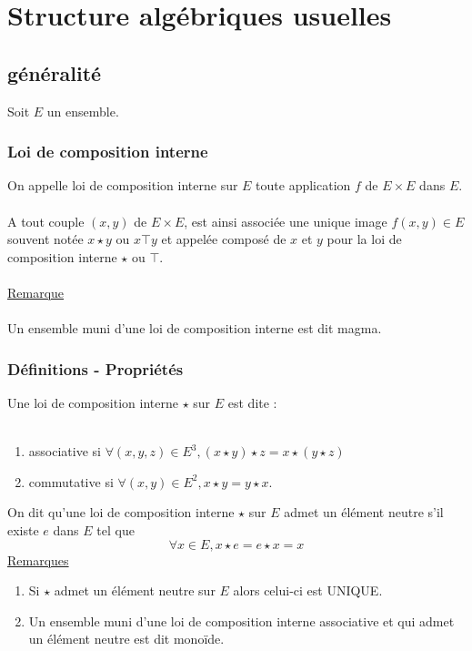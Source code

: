 \chapter{Structure algébriques usuelles}

\minitoc

\section{généralité}
Soit \(E\) un ensemble.
\subsection{Loi de composition interne}
\begin{defprop}
    On appelle loi de composition interne sur \(E\) toute application \(f\) de \(E \times E\) dans \(E\).\\~\\
    A tout couple \((x, y)\) de \(E \times E\), est ainsi associée une unique image \(f (x, y) \in E\) souvent notée \(x \star y\) ou \(x\top y\) et appelée composé de \(x\) et \(y\) pour la loi de composition interne \(\star\) ou \(\top\).\\~\\
    \underline{Remarque}\\~\\
    Un ensemble muni d’une loi de composition interne est dit magma.
\end{defprop}

\subsection{Définitions - Propriétés}

\begin{defprop}
    Une loi de composition interne \(\star\) sur \(E\) est dite :\\~\\
    \begin{enumerate}
        \item associative si \(\forall (x, y, z) \in E^3, (x \star y) \star z = x \star (y \star z)\)
        \item commutative si \(\forall (x, y) \in E^2, x \star y = y \star x\).
    \end{enumerate}
\end{defprop}

\begin{defprop}
    On dit qu’une loi de composition interne \(\star\) sur \(E\) admet un élément neutre s’il existe \(e\) dans \(E\) tel que
    \[\forall x \in E, x \star e = e \star x = x\]
    \underline{Remarques}
    \begin{enumerate}
        \item Si \(\star\) admet un élément neutre sur \(E\) alors celui-ci est UNIQUE.\\
        \item Un ensemble muni d’une loi de composition interne associative et qui admet un élément neutre est dit monoïde.
    \end{enumerate}
\end{defprop}

